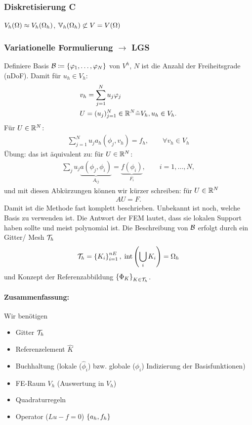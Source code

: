 \subsubsection{Diskretisierung C}
$V_h(\Omega) \approx V_h(\Omega_h)$, $\mathbb{V}_h(\Omega_h) \not \subset V  = V(\Omega)$
\subsubsection{Variationelle Formulierung $\to$ LGS}
Definiere Basis ${\cal B} \coloneqq \left\{ \varphi_1, \dots, \varphi_N \right\}$ von $V^h$, $N$ ist die Anzahl der Freiheitsgrade (nDoF). Damit für $u_h \in V_h$: 
\begin{align*}
 & v_h = \sum_{j = 1}^N u_j \varphi_j\\
 & U = (u_j)_{j = 1}^N \in \mathbb{R}^N \tilde = V_h, u_h \in V_h.
\end{align*}
Für $U \in \mathbb{R}^N$:
\begin{align*}
  \sum_{j = 1}^N u_j a_h(\phi_j, v_h) = f_h, \qquad \forall v_h \in V_h
 \end{align*}
Übung: das ist äquivalent zu: für $U \in \mathbb{R}^N$:
\begin{align*}
  \sum_j u_j \underbrace{a(\phi_j, \phi_i)}_{A_{ij}} = \underbrace{f(\phi_i)}_{F_i}, \qquad i = 1, \dots, N, 
\end{align*}
und mit diesen Abkürzungen können wir kürzer schreiben: für $U \in \mathbb{R}^N$
\begin{align*}
AU = F.
\end{align*}
Damit ist die Methode fast komplett beschrieben. Unbekannt ist noch, welche Basis zu verwenden ist. Die Antwort der FEM lautet, dass sie lokalen Support haben sollte und meist polynomial ist. Die Beschreibung von ${\cal B}$ erfolgt durch ein Gitter/ Mesh ${\cal T}_h$ 
\begin{align*}
  {\cal T}_h = \left\{ K_i \right\}_{i = 1}^{nE}, \; \operatorname{int}\left(\bigcup_i K_i \right) = \Omega_h
\end{align*}
und Konzept der Referenzabbildung $\left\{ \Phi_K \right\}_{K \in {\cal T}_h}$.

\paragraph{Zusammenfassung:} Wir benötigen 
\begin{itemize}
\item Gitter ${\cal T}_h$ 
\item Referenzelement $\hat K$ 
\item Buchhaltung (lokale ($\hat \phi_i$) bzw. globale ($\phi_i$) Indizierung der Basisfunktionen) 
\item FE-Raum $V_h$ (Auswertung in $V_h$) 
\item Quadraturregeln 
\item Operator ($Lu - f = 0$) $\left\{ a_h, f_h \right\}$ 
\end{itemize}
